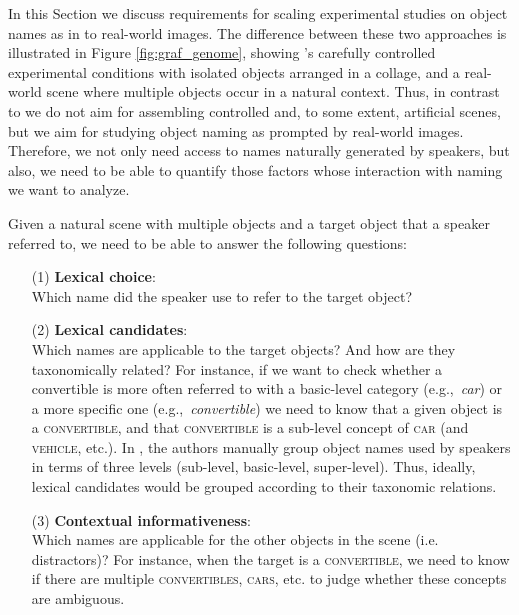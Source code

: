 \documentclass[runningheads]{llncs}
\newcommand{\refexp}[1]{\textsl{#1}}
\newcommand{\cat}[1]{\textsc{#1}}
\begin{document}
In this Section we discuss requirements for scaling experimental studies on object names as in \cite{graf2016animal} to real-world images.
The difference between these two approaches is illustrated in Figure \ref{fig:graf_genome}, showing  \cite{graf2016animal}'s carefully controlled experimental conditions with isolated objects arranged in a collage, and a real-world scene where multiple objects occur in a natural context.
Thus, in contrast to \cite{graf2016animal} we do not aim for assembling controlled and, to some extent, artificial scenes, but we aim for studying object naming as prompted by real-world images. Therefore, we not only need access to names naturally generated by speakers, but also, we need to be able to quantify those factors whose interaction with naming we want to analyze. 

Given a natural scene with multiple objects and a target object that a speaker referred to, we need to be able to answer the following questions:

\begin{itemize}
        \item[(1)] \textbf{Lexical choice}: \\
        Which name did the speaker use to refer to the target object?
		\item[(2)] \textbf{Lexical candidates}: \\
		Which names are applicable to the target objects? 
		And how are they taxonomically related? 
		For instance, if we want to check whether a convertible is more often referred to with a basic-level category (e.g.,~\refexp{car}) or a more specific one (e.g.,~\refexp{convertible}) we need to know that a given object is a \cat{convertible}, and that \cat{convertible} is a sub-level concept of \cat{car} (and \cat{vehicle}, etc.). 
		In \cite{graf2016animal}, the authors manually group object names used by speakers in terms of three levels (sub-level, basic-level, super-level). 
		Thus, ideally, %
		lexical candidates 
		would be grouped according to their taxonomic relations. 
		\item[(3)] \textbf{Contextual informativeness}: \\
		Which names are applicable for the other objects in the scene (i.e. distractors)?
		For instance, when the target is a \cat{convertible}, we need to know if there are multiple \cat{convertibles}, \cat{cars}, etc. to judge whether these concepts are ambiguous.
\end{itemize}
\end{document}
